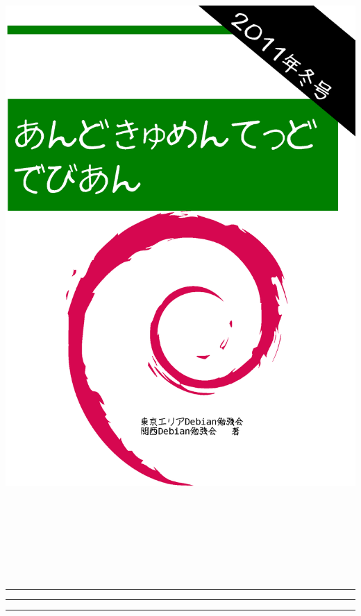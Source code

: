 \documentclass[mingoth,a4paper]{jsarticle}
\begin{document}
\begin{titlepage}
\includegraphics[height=252mm]{image2011-fuyu/2011-winter.eps}
\end{titlepage}

\setcounter{page}{1}
\begin{minipage}[]{0.2\hsize}
 \colorbox{dancerlightblue}{}
\end{minipage}
\begin{minipage}[]{0.8\hsize}
\hrule
\vspace{1mm}
\hrule
\setcounter{tocdepth}{1}
{\small
 \tableofcontents}
\vspace{1mm}
\hrule
\vspace{3cm}

\end{minipage}
\end{document}
